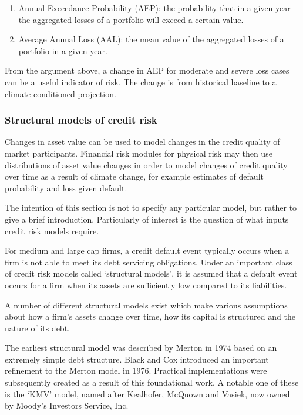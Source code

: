 \documentclass[a4paper,11pt]{extarticle} %
\theoremstyle{definition}
\begin{document}
\begin{enumerate}
    \item Annual Exceedance Probability (AEP): the probability that in a given year the aggregated losses of a portfolio will exceed a certain value.
    \item Average Annual Loss (AAL): the mean value of the aggregated losses of a portfolio in a given year.
\end{enumerate}

From the argument above, a change in AEP for moderate and severe loss cases can be a useful indicator of risk. The change is from historical baseline to a climate-conditioned projection.

\subsubsection{Structural models of credit risk}
Changes in asset value can be used to model changes in the credit quality of market participants. Financial risk modules for physical risk may then use distributions of asset value changes in order to model changes of credit quality over time as a result of climate change, for example estimates of default probability and loss given default.

The intention of this section is not to specify any particular model, but rather to give a brief introduction. Particularly of interest is the question of what inputs credit risk models require.

For medium and large cap firms, a credit default event typically occurs when a firm is not able to meet its debt servicing obligations. Under an important class of credit risk models called `structural models', it is assumed that a default event occurs for a firm when its assets are sufficiently low compared to its liabilities.

A number of different structural models exist which make various assumptions about how a firm's assets change over time, how its capital is structured and the nature of its debt.

The earliest structural model was described by Merton in 1974 \cite{Merton:1974} based on an extremely simple debt structure. Black and Cox \cite{BlackCox:1976} introduced an important refinement to the Merton model in 1976. Practical implementations were subsequently created as a result of this foundational work. A notable one of these is the `KMV' model, named after Kealhofer, McQuown and Vasiek, now owned by Moody's Investors Service, Inc.
\end{document}
